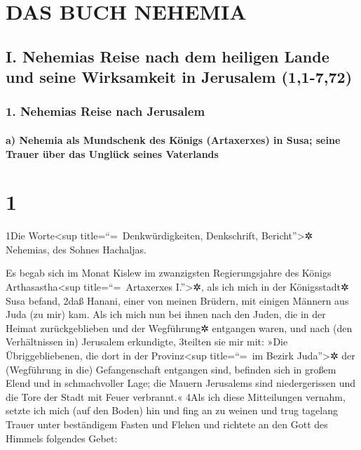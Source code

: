 \hypertarget{das-buch-nehemia}{%
\section{DAS BUCH NEHEMIA}\label{das-buch-nehemia}}

\hypertarget{i.-nehemias-reise-nach-dem-heiligen-lande-und-seine-wirksamkeit-in-jerusalem-11-772}{%
\subsection{I. Nehemias Reise nach dem heiligen Lande und seine
Wirksamkeit in Jerusalem
(1,1-7,72)}\label{i.-nehemias-reise-nach-dem-heiligen-lande-und-seine-wirksamkeit-in-jerusalem-11-772}}

\hypertarget{nehemias-reise-nach-jerusalem}{%
\subsubsection{1. Nehemias Reise nach
Jerusalem}\label{nehemias-reise-nach-jerusalem}}

\hypertarget{a-nehemia-als-mundschenk-des-kuxf6nigs-artaxerxes-in-susa-seine-trauer-uxfcber-das-ungluxfcck-seines-vaterlands}{%
\paragraph{a) Nehemia als Mundschenk des Königs (Artaxerxes) in Susa;
seine Trauer über das Unglück seines
Vaterlands}\label{a-nehemia-als-mundschenk-des-kuxf6nigs-artaxerxes-in-susa-seine-trauer-uxfcber-das-ungluxfcck-seines-vaterlands}}

\hypertarget{section}{%
\section{1}\label{section}}

1Die Worte\textless sup title=``=~Denkwürdigkeiten, Denkschrift,
Bericht''\textgreater✲ Nehemias, des Sohnes Hachaljas.

Es begab sich im Monat Kislew im zwanzigsten Regierungsjahre des Königs
Arthasastha\textless sup title=``=~Artaxerxes I.''\textgreater✲, als ich
mich in der Königsstadt✲ Susa befand, 2daß Hanani, einer von meinen
Brüdern, mit einigen Männern aus Juda (zu mir) kam. Als ich mich nun bei
ihnen nach den Juden, die in der Heimat zurückgeblieben und der
Wegführung✲ entgangen waren, und nach (den Verhältnissen in) Jerusalem
erkundigte, 3teilten sie mir mit: »Die Übriggebliebenen, die dort in der
Provinz\textless sup title=``=~im Bezirk Juda''\textgreater✲ der
(Wegführung in die) Gefangenschaft entgangen sind, befinden sich in
großem Elend und in schmachvoller Lage; die Mauern Jerusalems sind
niedergerissen und die Tore der Stadt mit Feuer verbrannt.« 4Als ich
diese Mitteilungen vernahm, setzte ich mich (auf den Boden) hin und fing
an zu weinen und trug tagelang Trauer unter beständigem Fasten und
Flehen und richtete an den Gott des Himmels folgendes Gebet:

